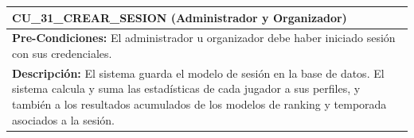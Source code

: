 \begin{center}
  \begin{tabular}{| p{7.5cm} | p{7.5cm} |}
    \hline
    \multicolumn{2}{|p{15cm}|}{\textbf{CU\_31\_CREAR\_SESION} (Administrador y Organizador)} \\ \hline
    \multicolumn{2}{|p{15cm}|}{\textbf{Pre-Condiciones:} El administrador u organizador debe haber iniciado sesión con sus credenciales.} \\ \hline
    \multicolumn{2}{|p{15cm}|}{\textbf{Descripción:} El sistema guarda el modelo de sesión en la base de datos. El sistema calcula y suma las estadísticas de cada jugador a sus perfiles, y también a los resultados acumulados de los modelos de ranking y temporada asociados a la sesión.} \\
    \hline
  \end{tabular}
\end{center}


